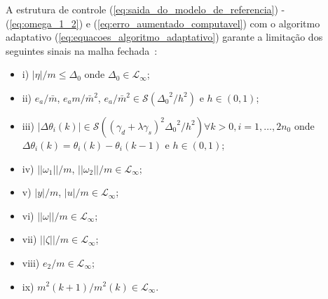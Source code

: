     \begin{teorema}
        A estrutura de controle (\ref{eq:saida_do_modelo_de_referencia}) - (\ref{eq:omega_1_2}) e
        (\ref{eq:erro_aumentado_computavel}) com o algoritmo adaptativo
        (\ref{eq:equacoes_algoritmo_adaptativo}) garante a limitação dos seguintes sinais na malha
        fechada~\cite{ref:STEFANELLO}:

        \begin{itemize}
            \item[] i) $|\eta|/m \leq \Delta_0$ onde $\Delta_0 \in \mathcal{L}_{\infty}$;
            \item[] ii) $e_a/\bar{m}$, $e_am/{\bar{m}}^2$, $e_a/{\bar{m}}^2 \in \mathcal{S}
                \left( {\Delta_0}^2/h^2 \right)$ e $h \in (0, 1)$;
            \item[] iii) $|\Delta\theta_i(k)| \in \mathcal{S}\left(\left(\gamma_d + \lambda\gamma_s\right)^2
                {\Delta_0}^2/h^2 \right) \forall k > 0, i=1, \ldots, 2n_0$ onde $\Delta\theta_i(k) = \theta_i(k)
                - \theta_i(k-1)$ e $h \in (0, 1)$;
            \item[] iv) $||\omega_1||/m$, $||\omega_2||/m \in \mathcal{L}_{\infty}$;
            \item[] v) $|y|/m$, $|u|/m \in \mathcal{L}_{\infty}$;
            \item[] vi) $||\omega||/m \in \mathcal{L}_{\infty}$;
            \item[] vii) $||\zeta||/m \in \mathcal{L}_{\infty}$;
            \item[] viii) $e_2/m \in \mathcal{L}_{\infty}$;
            \item[] ix) $m^2(k+1)/m^2(k) \in \mathcal{L}_{\infty}$.
        \end{itemize}
    \end{teorema}



